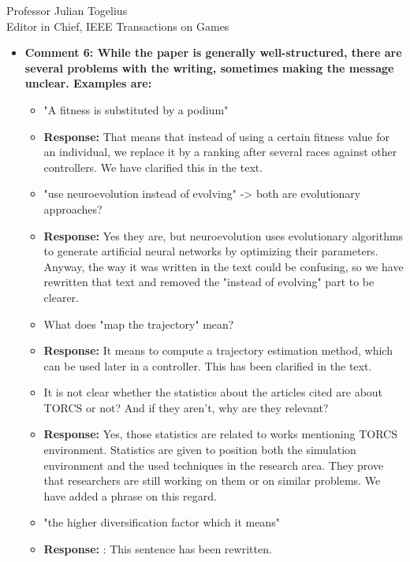 \documentclass[10pt]{letter} %
\begin{document}
\begin{letter}{Professor Julian Togelius \\ Editor in Chief, IEEE Transactions on Games}
\begin{enumerate}
\begin{itemize}

		\item {\bf 	  Comment 6: While the paper is generally well-structured, there are several problems with the writing, sometimes making the message unclear. Examples are:}
			\begin{itemize}
			\item "A fitness is substituted by a podium"
					\item {\bf Response:} 
					That means that instead of using a certain fitness value for an individual, we replace it by a ranking after several races against other controllers. We have clarified this in the text.\\
					
			\item "use neuroevolution instead of evolving" -> both are evolutionary approaches?
					\item {\bf Response:} 
					Yes they are, but  neuroevolution uses evolutionary algorithms to generate artificial neural networks by optimizing their parameters. Anyway, the way it was written in the text could be confusing, so we have rewritten that text and removed the "instead of evolving" part to be clearer. 
			\item What does "map the trajectory" mean?
					\item {\bf Response:} 
			It means to compute a trajectory estimation method, which can be used later in a controller. This has been clarified in the text.
					
			\item It is not clear whether the statistics about the articles cited are about TORCS or not? And if they aren't, why are they relevant?
					\item {\bf Response:} 
			Yes, those statistics are related to works mentioning TORCS environment. Statistics are given to position both the simulation environment and the used techniques in the research area. They prove that researchers are still working on them or on similar problems. 
We have added a phrase on this regard.
				
			\item "the higher diversification factor which it means"
					\item {\bf Response:} : This sentence has been rewritten.
			\end{itemize}
	


\end{itemize}
\end{enumerate}
\end{letter}
\end{document}

